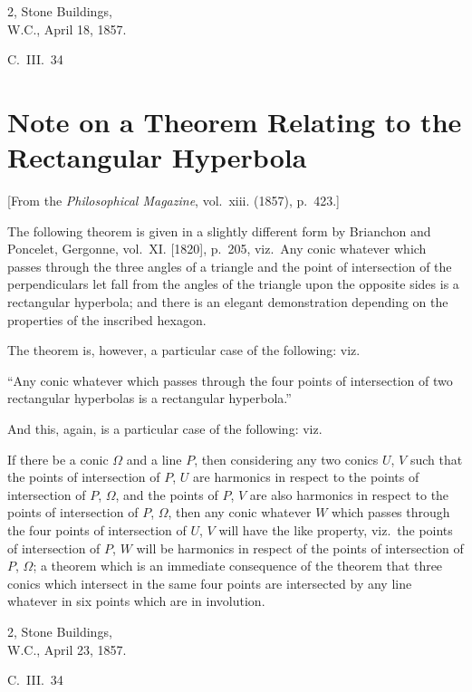 \documentclass[11pt,a4paper]{book}
\begin{document}
{{\begin{flushright}
2, Stone Buildings,\\
W.C., April 18, 1857.
\end{flushright}
\hfill C.~III.~34
\newpage


\section{Note on a Theorem Relating to the Rectangular Hyperbola}
\label{sec:206}

[From the \textit{Philosophical Magazine}, vol.~xiii. (1857), p.~423.]
\vspace{1em}

The following theorem is given in a slightly different form by Brianchon and Poncelet, Gergonne, vol.~XI. [1820], p.~205, viz.\ Any conic whatever which passes through the three angles of a triangle and the point of intersection of the perpendiculars let fall from the angles of the triangle upon the opposite sides is a rectangular hyperbola; and there is an elegant demonstration depending on the properties of the inscribed hexagon.

The theorem is, however, a particular case of the following: viz.

``Any conic whatever which passes through the four points of intersection of two rectangular hyperbolas is a rectangular hyperbola.''

And this, again, is a particular case of the following: viz.

If there be a conic $\Omega$ and a line $P$, then considering any two conics $U$, $V$ such that the points of intersection of $P$, $U$ are harmonics in respect to the points of intersection of $P$, $\Omega$, and the points of $P$, $V$ are also harmonics in respect to the points of intersection of $P$, $\Omega$, then any conic whatever $W$ which passes through the four points of intersection of $U$, $V$ will have the like property, viz.\ the points of intersection of $P$, $W$ will be harmonics in respect of the points of intersection of $P$, $\Omega$; a theorem which is an immediate consequence of the theorem that three conics which intersect in the same four points are intersected by any line whatever in six points which are in involution.

\begin{flushright}
2, Stone Buildings,\\
W.C., April 23, 1857.
\end{flushright}
\hfill C.~III.~34
\newpage


}}
\end{document}

